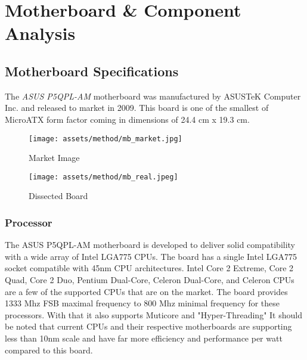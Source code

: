 \chapter{Motherboard \& Component Analysis}\label{ch:main}

\section{Motherboard Specifications}
The \emph{ASUS P5QPL-AM} motherboard was manufactured by ASUSTeK Computer Inc. and released to market in 2009. This board is one of the smallest of MicroATX form factor coming in dimensions of 24.4 cm x 19.3 cm. 

\begin{figure}[H]
\begin{minipage}[t]{7.2cm}
\begin{center}
\texttt{[image: assets/method/mb\_market.jpg]}
\caption{Market Image}
\label{fig:using:marketmbimage}
\end{center}
\end{minipage}
\hfill
\begin{minipage}[t]{7.2cm}
\begin{center}
\texttt{[image: assets/method/mb\_real.jpeg]}
\caption{Dissected Board}
\label{fig:using:dissectedmbimage}
\end{center}
\end{minipage}
\end{figure}

\subsection{Processor}
The ASUS P5QPL-AM motherboard is developed to deliver solid compatibility with a wide array of Intel LGA775 CPUs. The board has a single Intel LGA775 socket compatible with 45nm CPU architectures. Intel Core 2 Extreme, Core 2 Quad, Core 2 Duo, Pentium Dual-Core, Celeron Dual-Core, and Celeron CPUs are a few of the supported CPUs that are on the market. The board provides 1333 Mhz FSB maximal frequency to 800 Mhz minimal frequency for these processors. With that it also supports Muticore and "Hyper-Threading"
It should be noted that current CPUs and their respective motherboards are supporting less than 10nm scale and have far more efficiency and performance per watt compared to this board.

